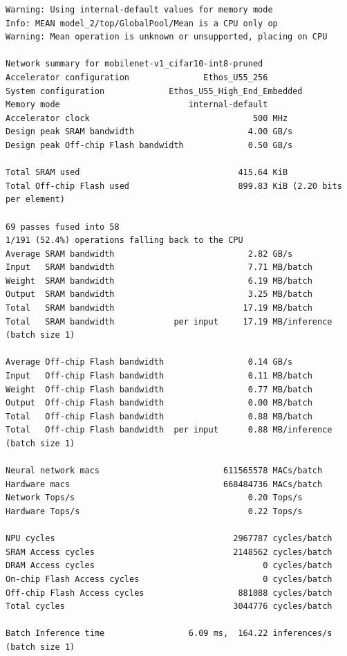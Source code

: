 \begin{lstlisting}[label={lst:vela_output_cifar10},
    caption=MobileNet v1 and CIFAR-10: vela output on an int8 tflite file]
Warning: Using internal-default values for memory mode
Info: MEAN model_2/top/GlobalPool/Mean is a CPU only op
Warning: Mean operation is unknown or unsupported, placing on CPU

Network summary for mobilenet-v1_cifar10-int8-pruned
Accelerator configuration               Ethos_U55_256
System configuration             Ethos_U55_High_End_Embedded
Memory mode                          internal-default
Accelerator clock                                 500 MHz
Design peak SRAM bandwidth                       4.00 GB/s
Design peak Off-chip Flash bandwidth             0.50 GB/s

Total SRAM used                                415.64 KiB
Total Off-chip Flash used                      899.83 KiB (2.20 bits per element)

69 passes fused into 58
1/191 (52.4%) operations falling back to the CPU
Average SRAM bandwidth                           2.82 GB/s
Input   SRAM bandwidth                           7.71 MB/batch
Weight  SRAM bandwidth                           6.19 MB/batch
Output  SRAM bandwidth                           3.25 MB/batch
Total   SRAM bandwidth                          17.19 MB/batch
Total   SRAM bandwidth            per input     17.19 MB/inference (batch size 1)

Average Off-chip Flash bandwidth                 0.14 GB/s
Input   Off-chip Flash bandwidth                 0.11 MB/batch
Weight  Off-chip Flash bandwidth                 0.77 MB/batch
Output  Off-chip Flash bandwidth                 0.00 MB/batch
Total   Off-chip Flash bandwidth                 0.88 MB/batch
Total   Off-chip Flash bandwidth  per input      0.88 MB/inference (batch size 1)

Neural network macs                         611565578 MACs/batch
Hardware macs                               668484736 MACs/batch
Network Tops/s                                   0.20 Tops/s
Hardware Tops/s                                  0.22 Tops/s

NPU cycles                                    2967787 cycles/batch
SRAM Access cycles                            2148562 cycles/batch
DRAM Access cycles                                  0 cycles/batch
On-chip Flash Access cycles                         0 cycles/batch
Off-chip Flash Access cycles                   881088 cycles/batch
Total cycles                                  3044776 cycles/batch

Batch Inference time                 6.09 ms,  164.22 inferences/s (batch size 1)
\end{lstlisting}

